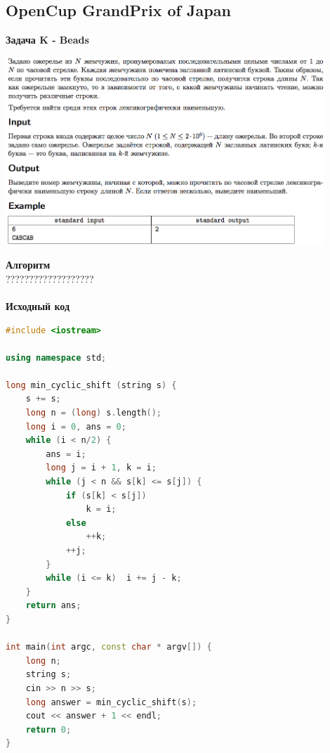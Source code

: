 \documentclass[a4paper,12pt]{article}
\begin{document}
%
%
\newpage
\subsection{OpenCup GrandPrix of Japan}

\textbf{{\large Задача K - Beads}} \\
\begin{center}
\includegraphics[width=0.9\textwidth]{OC_Japan/OC_Japan_K.png}\\ [1cm]
\end{center}
\newpage

\textbf{{\large Алгоритм}} \\
{\Huge ???????????????????} \\ 
\\
\textbf{{\large Исходный код}}
\begin{lstlisting}[language=C++]
#include <iostream>

using namespace std;

long min_cyclic_shift (string s) {
    s += s;
    long n = (long) s.length();
    long i = 0, ans = 0;
    while (i < n/2) {
        ans = i;
        long j = i + 1, k = i;
        while (j < n && s[k] <= s[j]) {
            if (s[k] < s[j])
                k = i;
            else
                ++k;
            ++j;
        }
        while (i <= k)  i += j - k;
    }
    return ans;
}

int main(int argc, const char * argv[]) {
    long n;
    string s;
    cin >> n >> s;
    long answer = min_cyclic_shift(s);
    cout << answer + 1 << endl;
    return 0;
}
\end{lstlisting}
\end{document}
